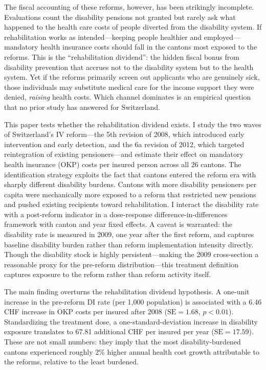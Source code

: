 \documentclass[12pt]{article}
\begin{document}
The fiscal accounting of these reforms, however, has been strikingly incomplete. Evaluations count the disability pensions not granted but rarely ask what happened to the health care costs of people diverted from the disability system. If rehabilitation works as intended---keeping people healthier and employed---mandatory health insurance costs should fall in the cantons most exposed to the reforms. This is the ``rehabilitation dividend'': the hidden fiscal bonus from disability prevention that accrues not to the disability system but to the health system. Yet if the reforms primarily screen out applicants who are genuinely sick, those individuals may substitute medical care for the income support they were denied, \emph{raising} health costs. Which channel dominates is an empirical question that no prior study has answered for Switzerland.

This paper tests whether the rehabilitation dividend exists. I study the two waves of Switzerland's IV reform---the 5th revision of 2008, which introduced early intervention and early detection, and the 6a revision of 2012, which targeted reintegration of existing pensioners---and estimate their effect on mandatory health insurance (OKP) costs per insured person across all 26 cantons. The identification strategy exploits the fact that cantons entered the reform era with sharply different disability burdens. Cantons with more disability pensioners per capita were mechanically more exposed to a reform that restricted new pensions and pushed existing recipients toward rehabilitation. I interact the disability rate with a post-reform indicator in a dose-response difference-in-differences framework with canton and year fixed effects. A caveat is warranted: the disability rate is measured in 2009, one year after the first reform, and captures baseline disability burden rather than reform implementation intensity directly. Though the disability stock is highly persistent---making the 2009 cross-section a reasonable proxy for the pre-reform distribution---this treatment definition captures exposure to the reform rather than reform activity itself.

The main finding overturns the rehabilitation dividend hypothesis. A one-unit increase in the pre-reform DI rate (per 1,000 population) is associated with a 6.46 CHF increase in OKP costs per insured after 2008 ($\text{SE} = 1.68$, $p < 0.01$). Standardizing the treatment dose, a one-standard-deviation increase in disability exposure translates to 67.81 additional CHF per insured per year ($\text{SE} = 17.59$). These are not small numbers: they imply that the most disability-burdened cantons experienced roughly 2\% higher annual health cost growth attributable to the reforms, relative to the least burdened.
\end{document}

